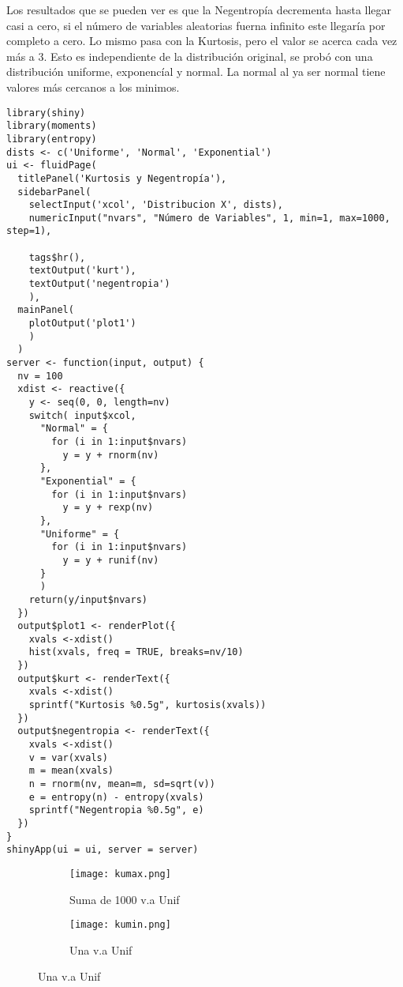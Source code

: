 \documentclass{article}
\begin{document}
\begin{enumerate}
Los resultados que se pueden ver es que la Negentropía decrementa hasta llegar casi a cero, si el número de variables aleatorias fuerna infinito este llegaría por completo a cero. Lo mismo pasa con la Kurtosis, pero el valor se acerca cada vez más a 3. Esto es independiente de la distribución original, se probó con una distribución uniforme, exponencíal y normal. La normal al ya ser normal tiene valores más cercanos a los minimos.

\begin{lstlisting}[frame=single]  % Start your code-block
library(shiny)
library(moments)
library(entropy)
dists <- c('Uniforme', 'Normal', 'Exponential')
ui <- fluidPage(
  titlePanel('Kurtosis y Negentropía'),
  sidebarPanel(
    selectInput('xcol', 'Distribucion X', dists),
    numericInput("nvars", "Número de Variables", 1, min=1, max=1000, step=1),

    tags$hr(),
    textOutput('kurt'),
    textOutput('negentropia')
    ),
  mainPanel(
    plotOutput('plot1')
    )
  )
server <- function(input, output) {
  nv = 100
  xdist <- reactive({
    y <- seq(0, 0, length=nv)
    switch( input$xcol,
      "Normal" = {
        for (i in 1:input$nvars) 
          y = y + rnorm(nv)
      },
      "Exponential" = {
        for (i in 1:input$nvars) 
          y = y + rexp(nv)
      },
      "Uniforme" = {
        for (i in 1:input$nvars) 
          y = y + runif(nv)
      }
      )
    return(y/input$nvars)
  })
  output$plot1 <- renderPlot({
    xvals <-xdist()
    hist(xvals, freq = TRUE, breaks=nv/10)
  })
  output$kurt <- renderText({
    xvals <-xdist()
    sprintf("Kurtosis %0.5g", kurtosis(xvals))
  })
  output$negentropia <- renderText({
    xvals <-xdist()
    v = var(xvals)
    m = mean(xvals)
    n = rnorm(nv, mean=m, sd=sqrt(v))
    e = entropy(n) - entropy(xvals)
    sprintf("Negentropia %0.5g", e)
  })
}
shinyApp(ui = ui, server = server)

\end{lstlisting}

\newpage
\begin{figure}[ht]
  \centering
  \begin{subfigure}[b]{0.4\linewidth}
      \centering
      \texttt{[image: kumax.png]}
      \caption{Suma de 1000 v.a Unif}
      \label{fig:x2f1}
  \end{subfigure}
  \begin{subfigure}[b]{0.4\linewidth}
      \centering
      \texttt{[image: kumin.png]}
      \caption{Una v.a Unif}
      \label{fig:y2h1}
  \end{subfigure}
\end{figure}



\end{enumerate}
\end{document}
